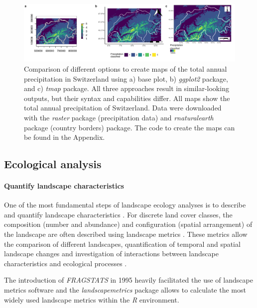 \documentclass[smallextended]{svjour3}       %
\begin{document}
\begin{figure}
\includegraphics[width=\linewidth]{data/Figure_2} \caption{Comparison of different options to create maps of the total annual precipitation in Switzerland using a) base plot, b) \textit{ggplot2} package, and c) \textit{tmap} package. All three approaches result in similar-looking outputs, but their syntax and capabilities differ. All maps show the total annual precipitation of Switzerland. Data were downloaded with the \textit{raster} package (precipitation data) and \textit{rnaturalearth} package (country borders) package. The code to create the maps can be found in the Appendix.}\label{fig:fig-map}
\end{figure}

\FloatBarrier

\hypertarget{sec:ecological_analysis}{%
\subsection{Ecological analysis}\label{sec:ecological_analysis}}

\hypertarget{sec:landscape_metrics}{%
\paragraph{Quantify landscape characteristics}\label{sec:landscape_metrics}}

One of the most fundamental steps of landscape ecology analyses is to describe and quantify landscape characteristics \cite{Turner2005,Lausch2015}.
For discrete land cover classes, the composition (number and abundance) and configuration (spatial arrangement) of the landscape are often described using landscape metrics \cite{Gustafson1998,Uuemaa2009,Uuemaa2013,Gustafson2019}.
These metrics allow the comparison of different landscapes, quantification of temporal and spatial landscape changes and investigation of interactions between landscape characteristics and ecological processes \cite{Uuemaa2009}.

The introduction of \textit{FRAGSTATS} in 1995 heavily facilitated the use of landscape metrics software \cite{McGarigal2012,Kupfer2012,Gustafson2019} and the \textit{landscapemetrics} package \cite{Hesselbarth2019} allows to calculate the most widely used landscape metrics within the \textit{R} environment.
\end{document}
